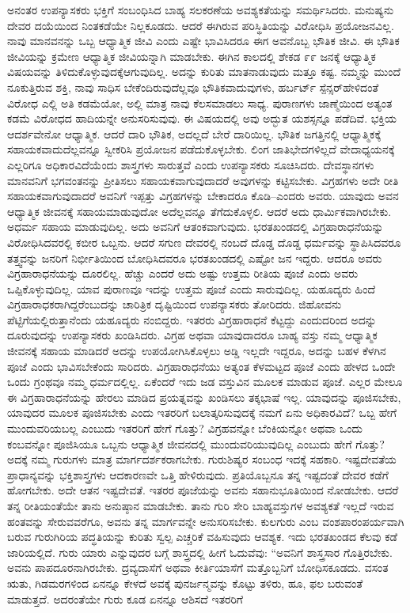 ಅನಂತರ ಉಪನ್ಯಾಸಕರು ಭಕ್ತಿಗೆ ಸಂಬಂಧಿಸಿದ ಬಾಹ್ಯ ಸಲಕರಣೆಯ ಅವಶ್ಯಕತೆಯನ್ನು ಸಮರ್ಥಿಸಿದರು. ಮನುಷ್ಯನು ದೇವರ ದಯೆಯಿಂದ ನಿಂತಕಡೆಯೇ ನಿಲ್ಲಕೂಡದು. ಆದರೆ ಈಗಿರುವ ಪರಿಸ್ಥಿತಿಯನ್ನು ವಿರೋಧಿಸಿ ಪ್ರಯೋಜನವಿಲ್ಲ. ನಾವು ಮಾನವನನ್ನು ಒಬ್ಬ ಆಧ್ಯಾತ್ಮಿಕ ಜೀವಿ ಎಂದು ಎಷ್ಟೇ ಭಾವಿಸಿದರೂ ಈಗ ಅವನೊಬ್ಬ ಭೌತಿಕ ಜೀವಿ. ಈ ಭೌತಿಕ ಜೀವಿಯನ್ನು ಕ್ರಮೇಣ ಆಧ್ಯಾತ್ಮಿಕ ಜೀವಿಯನ್ನಾಗಿ ಮಾಡಬೇಕು. ಈಗಿನ ಕಾಲದಲ್ಲಿ ಶೇಕಡ ೯೯ ಜನಕ್ಕೆ ಆಧ್ಯಾತ್ಮಿಕ ವಿಷಯವನ್ನು ತಿಳಿದುಕೊಳ್ಳುವುದಕ್ಕೆ\break ಆಗುವುದಿಲ್ಲ. ಅದನ್ನು ಕುರಿತು ಮಾತನಾಡುವುದು ಮತ್ತೂ ಕಷ್ಟ. ನಮ್ಮನ್ನು ಮುಂದೆ ನೂಕುತ್ತಿರುವ ಶಕ್ತಿ, ನಾವು ಸಾಧಿಸ ಬೇಕೆಂದಿರುವುದೆಲ್ಲವೂ ಭೌತಿಕವಾದುವುಗಳು, ಹರ್ಬರ್ಟ್​ ಸ್ಪೆನ್ಸರ್​ ಹೇಳಿದಂತೆ ವಿರೋಧ ಎಲ್ಲಿ ಅತಿ ಕಡಮೆಯೋ, ಅಲ್ಲಿ ಮಾತ್ರ ನಾವು ಕೆಲಸಮಾಡಲು ಸಾಧ್ಯ. ಪುರಾಣಗಳು ಜಾಣ್ಮೆಯಿಂದ ಅತ್ಯಂತ ಕಡಮೆ ವಿರೋಧದ ಹಾದಿಯನ್ನೇ ಅನುಸರಿಸುವುವು. ಈ ವಿಷಯದಲ್ಲಿ ಅವು ಅದ್ಭುತ ಯಶಸ್ಸನ್ನೂ ಪಡೆದಿವೆ. ಭಕ್ತಿಯ ಆದರ್ಶವೇನೋ ಆಧ್ಯಾತ್ಮಿಕ. ಆದರೆ ದಾರಿ ಭೌತಿಕ, ಅದಲ್ಲದೆ ಬೇರೆ ದಾರಿಯಿಲ್ಲ. ಭೌತಿಕ ಜಗತ್ತಿನಲ್ಲಿ ಆಧ್ಯಾತ್ಮಿಕಕ್ಕೆ ಸಹಾಯಕವಾದುದೆಲ್ಲವನ್ನೂ ಸ್ವೀಕರಿಸಿ ಪ್ರಯೋಜನ ಪಡೆದುಕೊಳ್ಳಬೇಕು. ಲಿಂಗ ಜಾತಿಭೇದಗಳಿಲ್ಲದೆ ವೇದಾಧ್ಯಯನಕ್ಕೆ ಎಲ್ಲರಿಗೂ ಅಧಿಕಾರವಿದೆಯೆಂದು ಶಾಸ್ತ್ರಗಳು ಸಾರುತ್ತವೆ ಎಂದು ಉಪನ್ಯಾಸಕರು ಸೂಚಿಸಿದರು. ದೇವಸ್ಥಾನಗಳು ಮಾನವನಿಗೆ ಭಗವಂತನನ್ನು ಪ್ರೀತಿಸಲು ಸಹಾಯಕವಾಗುವುದಾದರೆ ಅವುಗಳನ್ನು ಕಟ್ಟಿಸಬೇಕು. ವಿಗ್ರಹಗಳು ಅದೇ ರೀತಿ ಸಹಾಯಕವಾಗುವುದಾದರೆ ಅವನಿಗೆ ಇಪ್ಪತ್ತು ವಿಗ್ರಹಗಳನ್ನು ಬೇಕಾದರೂ ಕೊಡಿ–ಎಂದರು ಅವರು. ಯಾವುದು ಅವನ ಆಧ್ಯಾತ್ಮಿಕ ಜೀವನಕ್ಕೆ ಸಹಾಯಮಾಡುವುದೋ ಅದೆಲ್ಲವನ್ನೂ ತೆಗೆದುಕೊಳ್ಳಲಿ. ಆದರೆ ಅದು ಧಾರ್ಮಿಕವಾಗಿರಬೇಕು. ಅಧರ್ಮ ಸಹಾಯ ಮಾಡುವುದಿಲ್ಲ. ಅದು ಅವನಿಗೆ ಆತಂಕವಾಗುವುದು. ಭರತಖಂಡದಲ್ಲಿ ವಿಗ್ರಹಾರಾಧನೆಯನ್ನು ವಿರೋಧಿಸಿದವರಲ್ಲಿ ಕಬೀರ ಒಬ್ಬನು. ಆದರೆ ಸಗುಣ ದೇವರಲ್ಲಿ ನಂಬದೆ ದೊಡ್ಡ ದೊಡ್ಡ ಧರ್ಮವನ್ನು ಸ್ಥಾಪಿಸಿದವರೂ ತತ್ತ್ವವನ್ನು ಜನರಿಗೆ ನಿರ್ಭೀತಿಯಿಂದ ಬೋಧಿಸಿದವರೂ ಭರತಖಂಡದಲ್ಲಿ ಎಷ್ಟೋ ಜನ ಇದ್ದರು. ಆದರೂ ಅವರು ವಿಗ್ರಹಾರಾಧನೆಯನ್ನು ದೂರಲಿಲ್ಲ. ಹೆಚ್ಚು ಎಂದರೆ ಅದು ಅಷ್ಟು ಉತ್ತಮ ರೀತಿಯ ಪೂಜೆ ಎಂದು ಅವರು ಒಪ್ಪಿಕೊಳ್ಳುವುದಿಲ್ಲ. ಯಾವ ಪುರಾಣವೂ ಇದನ್ನು ಉತ್ತಮ ಪೂಜೆ ಎಂದು ಸಾರುವುದಿಲ್ಲ. ಯಹೂದ್ಯರು ಹಿಂದೆ ವಿಗ್ರಹಾರಾಧಕರಾಗಿದ್ದರೆಂಬುದನ್ನು ಚಾರಿತ್ರಿಕ ದೃಷ್ಟಿಯಿಂದ ಉಪನ್ಯಾಸಕರು ತೋರಿದರು. ಜಿಹೋವನು ಪೆಟ್ಟಿಗೆಯಲ್ಲಿರುತ್ತಾನೆಂದು ಯಹೂದ್ಯರು ನಂಬಿದ್ದರು. ಇತರರು ವಿಗ್ರಹಾರಾಧನೆ ಕೆಟ್ಟದ್ದು ಎಂದುದರಿಂದ ಅದನ್ನು ದೂರುವುದನ್ನು ಉಪನ್ಯಾಸಕರು ಖಂಡಿಸಿದರು. ವಿಗ್ರಹ ಅಥವಾ ಯಾವುದಾದರೂ ಬಾಹ್ಯ ವಸ್ತು ನಮ್ಮ ಆಧ್ಯಾತ್ಮಿಕ ಜೀವನಕ್ಕೆ ಸಹಾಯ ಮಾಡಿದರೆ ಅದನ್ನು ಉಪಯೋಗಿಸಿಕೊಳ್ಳಲು ಅಡ್ಡಿ ಇಲ್ಲದೇ ಇದ್ದರೂ, ಅದನ್ನು ಬಹಳ ಕೆಳಗಿನ ಪೂಜೆ ಎಂದು ಭಾವಿಸಬೇಕೆಂದು ಸಾರಿದರು. ವಿಗ್ರಹಾರಾಧನೆಯು ಅತ್ಯಂತ ಕೆಳಮಟ್ಟದ ಪೂಜೆ ಎಂದು ಹೇಳದ ಒಂದೇ ಒಂದು ಗ್ರಂಥವೂ ನಮ್ಮ ಧರ್ಮದಲ್ಲಿಲ್ಲ. ಏಕೆಂದರೆ ಇದು ಜಡ ವಸ್ತುವಿನ ಮೂಲಕ ಮಾಡುವ ಪೂಜೆ. ಎಲ್ಲರ ಮೇಲೂ ಈ ವಿಗ್ರಹಾರಾಧನೆಯನ್ನು ಹೇರಲು ಮಾಡಿದ ಪ್ರಯತ್ನವನ್ನು ಖಂಡಿಸಲು ತಕ್ಕಭಾಷೆ ಇಲ್ಲ. ಯಾವುದನ್ನು ಪೂಜಿಸಬೇಕು, ಯಾವುದರ ಮೂಲಕ ಪೂಜಿಸಬೇಕು ಎಂದು ಇತರರಿಗೆ ಬಲಾತ್ಕರಿಸುವುದಕ್ಕೆ ನಮಗೆ ಏನು ಅಧಿಕಾರವಿದೆ? ಒಬ್ಬ ಹೇಗೆ ಮುಂದುವರಿಯಬಲ್ಲ ಎಂಬುದು ಇತರರಿಗೆ ಹೇಗೆ ಗೊತ್ತು? ವಿಗ್ರಹವನ್ನೋ ಬೆಂಕಿಯನ್ನೋ ಅಥವಾ ಒಂದು ಕಂಬವನ್ನೋ ಪೂಜಿಸಿಯೂ ಒಬ್ಬನು ಆಧ್ಯಾತ್ಮಿಕ ಜೀವನದಲ್ಲಿ ಮುಂದುವರಿಯುವುದಿಲ್ಲ ಎಂಬುದು ಹೇಗೆ ಗೊತ್ತು? ಅದಕ್ಕೆ ನಮ್ಮ ಗುರುಗಳು ಮಾತ್ರ ಮಾರ್ಗದರ್ಶಕರಾಗಬೇಕು. ಗುರುಶಿಷ್ಯರ ಸಂಬಂಧ ಇದಕ್ಕೆ ಸಹಕಾರಿ. ಇಷ್ಟದೇವತೆಯ ಪ್ರಾಧಾನ್ಯವನ್ನು ಭಕ್ತಿಶಾಸ್ತ್ರಗಳು ಆದಕಾರಣವೇ ಒತ್ತಿ ಹೇಳಿರುವುದು. ಪ್ರತಿಯೊಬ್ಬನೂ ತನ್ನ ಇಷ್ಟದಂತೆ ದೇವರ ಕಡೆಗೆ ಹೋಗಬೇಕು. ಅದೇ ಆತನ ಇಷ್ಟ\break ದೇವತೆ. ಇತರರ ಪೂಜೆಯನ್ನು ಅವನು ಸಹಾನುಭೂತಿಯಿಂದ ನೋಡಬೇಕು. ಆದರೆ ತನ್ನ ರೀತಿಯಂತೆಯೇ ತಾನು ಅನುಷ್ಠಾನ ಮಾಡಬೇಕು. ತಾನು ಗುರಿ ಸೇರಿ ಬಾಹ್ಯವಸ್ತುಗಳ ಅವಶ್ಯಕತೆ ಇಲ್ಲದೆ ಇರುವ ಹಂತವನ್ನು ಸೇರುವವರೆಗೂ, ಅವನು ತನ್ನ ಮಾರ್ಗವನ್ನೇ ಅನುಸರಿಸಬೇಕು. ಕುಲಗುರು ಎಂಬ ವಂಶಪಾರಂಪರ್ಯವಾಗಿ ಬರುವ ಗುರುಗಿರಿಯ ಪದ್ಧತಿಯನ್ನು ಕುರಿತು ಸ್ವಲ್ಪ ಎಚ್ಚರಿಕೆ ವಹಿಸುವುದು ಆವಶ್ಯಕ. ಇದು ಭರತಖಂಡದ ಕೆಲವು ಕಡೆ ಜಾರಿಯಲ್ಲಿದೆ. ಗುರು ಯಾರು ಎನ್ನುವುದರ ಬಗ್ಗೆ ಶಾಸ್ತ್ರದಲ್ಲಿ ಹೀಗೆ ಓದುವೆವು: “ಅವನಿಗೆ ಶಾಸ್ತ್ರಸಾರ ಗೊತ್ತಿರಬೇಕು. ಅವನು ಪಾಪದೂರನಾಗಿರಬೇಕು. ದ್ರವ್ಯದಾಸೆಗೆ ಅಥವಾ ಕೀರ್ತಿಯಾಸೆಗೆ ಮತ್ತೊಬ್ಬನಿಗೆ ಬೋಧಿಸಕೂಡದು. ವಸಂತ ಋತು, ಗಿಡಮರಗಳಿಂದ ಏನನ್ನೂ ಕೇಳದೆ ಅವಕ್ಕೆ ಪುನರ್ಜನ್ಮವನ್ನು ಕೊಟ್ಟು ತಳಿರು, ಹೂ, ಫಲ ಬರುವಂತೆ ಮಾಡುತ್ತದೆ. ಅದರಂತೆಯೇ ಗುರು ಕೂಡ ಏನನ್ನೂ ಆಶಿಸದೆ ಇತರರಿಗೆ 